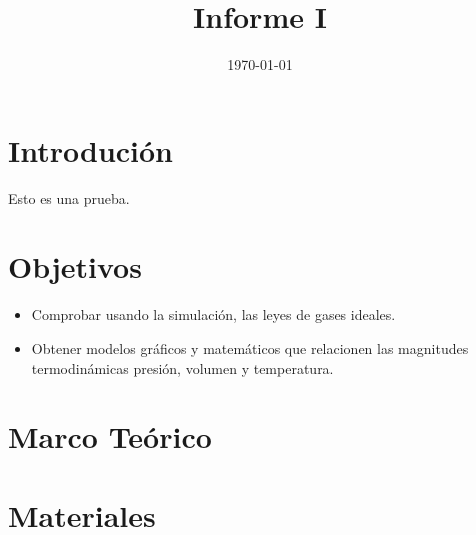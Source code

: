 \documentclass[]{article}
\title{Informe I}
\author{}
\date{\today}
\begin{document}
\maketitle  


\tableofcontents
\section{Introdución}
Esto es una prueba.



\section{Objetivos}
\begin{itemize}
    \item Comprobar usando la simulación, las leyes de gases ideales.
    \item Obtener modelos gráficos y matemáticos que relacionen las magnitudes termodinámicas presión,
    volumen y temperatura.
\end{itemize}


\section{Marco Teórico}




\section{Materiales}


\end{document}
